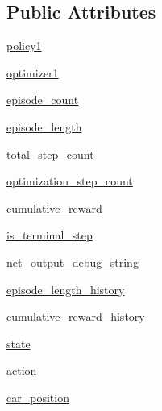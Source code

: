\subsection*{Public Attributes}
\begin{DoxyCompactItemize}
\item 
\hyperlink{classpolicy_gradient_1_1_q_learning_training_node_a37c369f5ac5458dbbc0e4e6946fb3171}{policy1}
\item 
\hyperlink{classpolicy_gradient_1_1_q_learning_training_node_ac20060dc24d869ed2f9922c2b4126f19}{optimizer1}
\item 
\hyperlink{classpolicy_gradient_1_1_q_learning_training_node_ac869946fea336c443892b770981153ee}{episode\+\_\+count}
\item 
\hyperlink{classpolicy_gradient_1_1_q_learning_training_node_a5773373ab6f9f944499f1d296b37e7bc}{episode\+\_\+length}
\item 
\hyperlink{classpolicy_gradient_1_1_q_learning_training_node_a51b494957db227f163dab00919accd14}{total\+\_\+step\+\_\+count}
\item 
\hyperlink{classpolicy_gradient_1_1_q_learning_training_node_a002593796d45dbad4638e691e71d4b19}{optimization\+\_\+step\+\_\+count}
\item 
\hyperlink{classpolicy_gradient_1_1_q_learning_training_node_a73f0820c0b97bd68bfea0c189f646c05}{cumulative\+\_\+reward}
\item 
\hyperlink{classpolicy_gradient_1_1_q_learning_training_node_aaf47eb00c62e895e5fa633bdcff4dad6}{is\+\_\+terminal\+\_\+step}
\item 
\hyperlink{classpolicy_gradient_1_1_q_learning_training_node_a5bf8abe5bd8b8bb5a4e75479ba173ccc}{net\+\_\+output\+\_\+debug\+\_\+string}
\item 
\hyperlink{classpolicy_gradient_1_1_q_learning_training_node_ab0b18966b84de1da395803f2b578a505}{episode\+\_\+length\+\_\+history}
\item 
\hyperlink{classpolicy_gradient_1_1_q_learning_training_node_a46a61c05fb130f011f35fbad64a25c8b}{cumulative\+\_\+reward\+\_\+history}
\item 
\hyperlink{classpolicy_gradient_1_1_q_learning_training_node_ade80819acefe831706a4f02c100d672e}{state}
\item 
\hyperlink{classpolicy_gradient_1_1_q_learning_training_node_ac952872199643b62f3e383183276864e}{action}
\item 
\hyperlink{classpolicy_gradient_1_1_q_learning_training_node_a671b5cb52435b882c55f271749ddeb08}{car\+\_\+position}
\item 

\end{DoxyCompactItemize}
